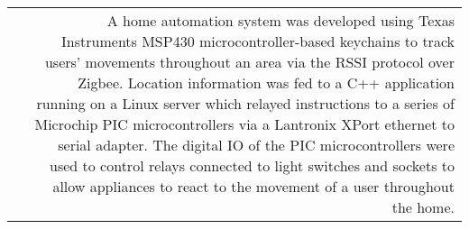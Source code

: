 \begin{longtable}{L!{\VRule}R}
&A home automation system was developed using Texas Instruments MSP430 microcontroller-based keychains to track users' movements throughout an area via the RSSI protocol over Zigbee. Location information was fed to a C++ application running on a Linux server which relayed instructions to a series of Microchip PIC microcontrollers via a Lantronix XPort ethernet to serial adapter. The digital IO of the PIC microcontrollers were used to control relays connected to light switches and sockets to allow appliances to react to the movement of a user throughout the home.\\

\end{longtable}
